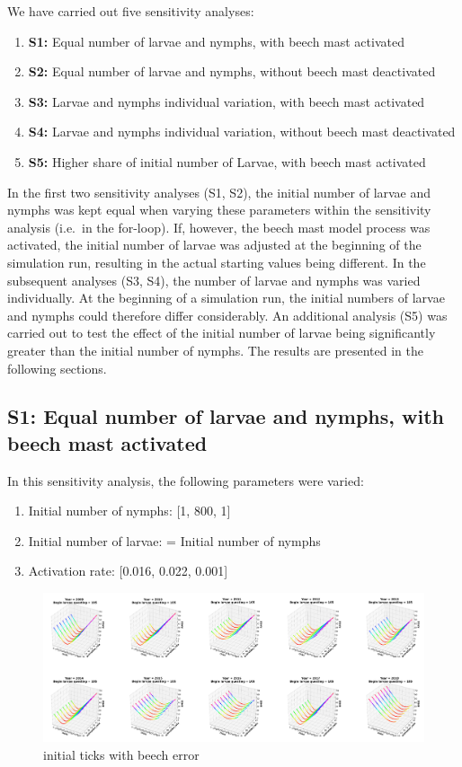 \documentclass[a4paper, 11pt]{scrartcl}
\begin{document}
We have carried out five sensitivity analyses:

\begin{enumerate}
\item[] \textbf{S1:} Equal number of larvae and nymphs, with beech mast activated
\item[] \textbf{S2:} Equal number of larvae and nymphs, without beech mast deactivated
\item[] \textbf{S3:} Larvae and nymphs individual variation, with beech mast activated
\item[] \textbf{S4:} Larvae and nymphs individual variation, without beech mast deactivated
\item[] \textbf{S5:} Higher share of initial number of Larvae, with beech mast activated
\end{enumerate}

In the first two sensitivity analyses (S1, S2), the initial number of larvae and nymphs was kept equal when varying these parameters within the sensitivity analysis (i.e.\ in
the for-loop). If, however, the beech mast model process was activated, the initial number of larvae was adjusted at the beginning of the simulation run, resulting in the actual
starting values being different. In the subsequent analyses (S3, S4), the number of larvae and nymphs was varied individually. At the beginning of a simulation run, the initial
numbers of larvae and nymphs could therefore differ considerably. An additional analysis (S5) was carried out to test the effect of the initial number of larvae being
significantly greater than the initial number of nymphs. The results are presented in the following sections.


\newpage
\subsection{S1: Equal number of larvae and nymphs, with beech mast activated}
In this sensitivity analysis, the following parameters were varied:


\begin{enumerate}
\item Initial number of nymphs: [1, 800, 1]
\item Initial number of larvae: = Initial number of nymphs
\item Activation rate: [0.016, 0.022, 0.001]
\end{enumerate}


\begin{figure}[h!]
\centering
\includegraphics[width=1.0\textwidth]{figures/initial_ticks_with_beech_error.PNG}
\caption{initial ticks with beech error}
\label{fig:initial_ticks_with_beech_error}
\end{figure}
\end{document}
